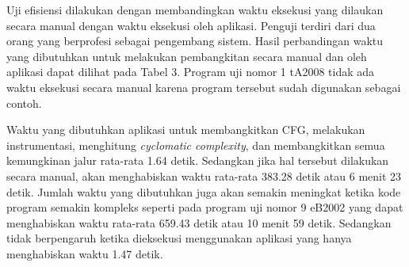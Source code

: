 \begin{table}
\begin{minipage}{0.5\textwidth}
\begin{tabular}{llll}
				 \\ \hline
				\bottomrule
			
			\end{tabular}
			
		\end{minipage}
	\end{table}
Uji efisiensi dilakukan dengan membandingkan waktu eksekusi yang dilaukan secara manual dengan waktu eksekusi oleh aplikasi. Penguji terdiri dari dua orang yang berprofesi sebagai pengembang sistem. Hasil perbandingan waktu yang dibutuhkan untuk melakukan pembangkitan secara manual dan oleh aplikasi dapat dilihat pada Tabel 3. Program uji nomor 1 tA2008 tidak ada waktu eksekusi secara manual karena program tersebut sudah digunakan sebagai contoh.

Waktu yang dibutuhkan aplikasi untuk membangkitkan CFG, melakukan instrumentasi, menghitung \textit{cyclomatic complexity}, dan membangkitkan semua kemungkinan jalur rata-rata 1.64 detik. Sedangkan jika hal tersebut dilakukan secara manual, akan menghabiskan waktu rata-rata 383.28 detik atau 6 menit 23 detik. Jumlah waktu yang dibutuhkan juga akan semakin meningkat ketika kode program semakin kompleks seperti pada program uji nomor 9 eB2002 yang dapat menghabiskan waktu rata-rata 659.43 detik atau 10 menit 59 detik. Sedangkan tidak berpengaruh ketika dieksekusi menggunakan aplikasi yang hanya menghabiskan waktu 1.47 detik.
   

